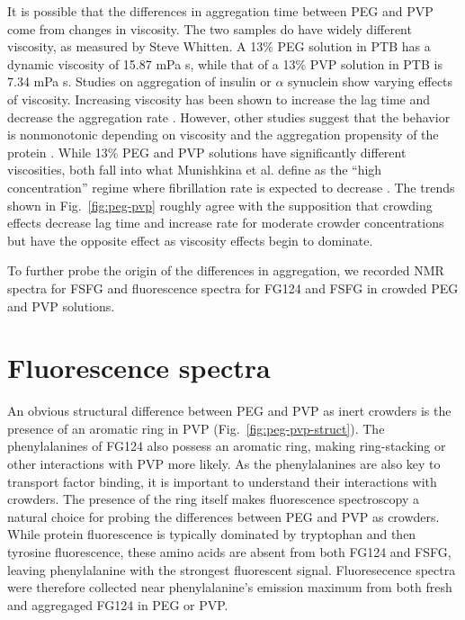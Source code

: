It is possible that the differences in aggregation time between PEG and PVP come from changes in viscosity.  The two samples do have widely different viscosity, as measured by Steve Whitten.  A 13\% PEG solution in PTB has a dynamic viscosity of 15.87 mPa s, while that of a 13\% PVP solution in PTB is 7.34 mPa s.  Studies on aggregation of insulin or $\alpha$ synuclein show varying effects of viscosity.  Increasing viscosity has been shown to increase the lag time and decrease the aggregation rate \cite{saha16,sleutel12}.  However, other studies suggest that the behavior is nonmonotonic depending on viscosity and the aggregation propensity of the protein \cite{munishkina04, magno10}.  While 13\% PEG and PVP solutions have significantly different viscosities, both fall into what Munishkina et al. define as the ``high concentration'' regime where fibrillation rate is expected to decrease \cite{munishkina04}.  The trends shown in Fig.~\ref{fig:peg-pvp} roughly agree with the supposition that crowding effects decrease lag time and increase rate for moderate crowder concentrations but have the opposite effect as viscosity effects begin to dominate.

To further probe the origin of the differences in aggregation, we recorded NMR spectra for FSFG and fluorescence spectra for FG124 and FSFG in crowded PEG and PVP solutions.

\section{Fluorescence spectra}

An obvious structural difference between PEG and PVP as inert crowders is the presence of an aromatic ring in PVP (Fig.~\ref{fig:peg-pvp-struct}).  The phenylalanines of FG124 also possess an aromatic ring, making ring-stacking or other interactions with PVP more likely.  As the phenylalanines are also key to transport factor binding, it is important to understand their interactions with crowders.  The presence of the ring itself makes fluorescence spectroscopy a natural choice for probing the differences between PEG and PVP as crowders.  While protein fluorescence is typically dominated by tryptophan and then tyrosine fluorescence, these amino acids are absent from both FG124 and FSFG, leaving phenylalanine with the strongest fluorescent signal.  Fluoresecence spectra were therefore collected near phenylalanine's emission maximum from both fresh and aggregaged FG124 in PEG or PVP.

